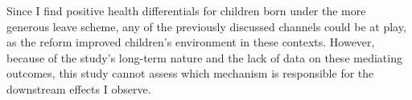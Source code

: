 

Since I find positive health differentials for children born under the more generous leave scheme, any of the previously discussed channels could be at play, as the reform improved children's environment in these contexts. However, because of the study's long-term nature and the lack of data on these mediating outcomes, this study cannot assess which mechanism is responsible for the downstream effects I observe.
















